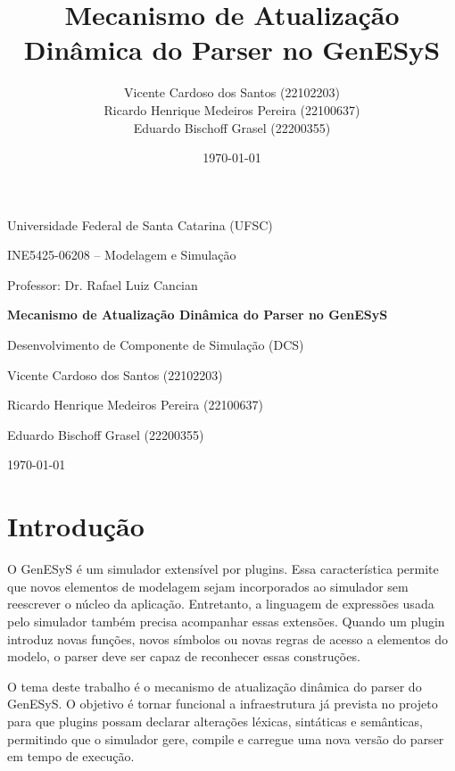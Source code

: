\documentclass[12pt,a4paper]{article}
\title{Mecanismo de Atualiza\c{c}\~ao Din\^amica do Parser no GenESyS}
\author{
Vicente Cardoso dos Santos (22102203) \\
Ricardo Henrique Medeiros Pereira (22100637) \\
Eduardo Bischoff Grasel (22200355)
}
\date{\today}
\begin{document}
\begin{titlepage}
    \thispagestyle{empty}
    \centering
    \vspace*{2cm}
    {\Large Universidade Federal de Santa Catarina (UFSC)\par}
    \vspace{0.5cm}
    {\large INE5425-06208 -- Modelagem e Simula\c{c}\~ao\par}
    \vspace{0.5cm}
    {\large Professor: Dr. Rafael Luiz Cancian\par}
    \vfill
    {\bfseries\LARGE Mecanismo de Atualiza\c{c}\~ao Din\^amica do Parser no GenESyS\par}
    \vspace{0.7cm}
    {\large Desenvolvimento de Componente de Simula\c{c}\~ao (DCS)\par}
    \vfill
    {\large Vicente Cardoso dos Santos (22102203)\par}
    {\large Ricardo Henrique Medeiros Pereira (22100637)\par}
    {\large Eduardo Bischoff Grasel (22200355)\par}
    \vspace{1.5cm}
    {\large \today\par}
\end{titlepage}

\tableofcontents
\newpage
{}

\section{Introdu\c{c}\~ao}

O GenESyS \'e um simulador extens\'ivel por plugins. Essa caracter\'istica permite que novos elementos de modelagem sejam incorporados ao simulador sem reescrever o n\'ucleo da aplica\c{c}\~ao. Entretanto, a linguagem de express\~oes usada pelo simulador tamb\'em precisa acompanhar essas extens\~oes. Quando um plugin introduz novas fun\c{c}\~oes, novos s\'imbolos ou novas regras de acesso a elementos do modelo, o parser deve ser capaz de reconhecer essas constru\c{c}\~oes.

O tema deste trabalho \'e o mecanismo de atualiza\c{c}\~ao din\^amica do parser do GenESyS. O objetivo \'e tornar funcional a infraestrutura j\'a prevista no projeto para que plugins possam declarar altera\c{c}\~oes l\'exicas, sint\'aticas e sem\^anticas, permitindo que o simulador gere, compile e carregue uma nova vers\~ao do parser em tempo de execu\c{c}\~ao.
\end{document}
